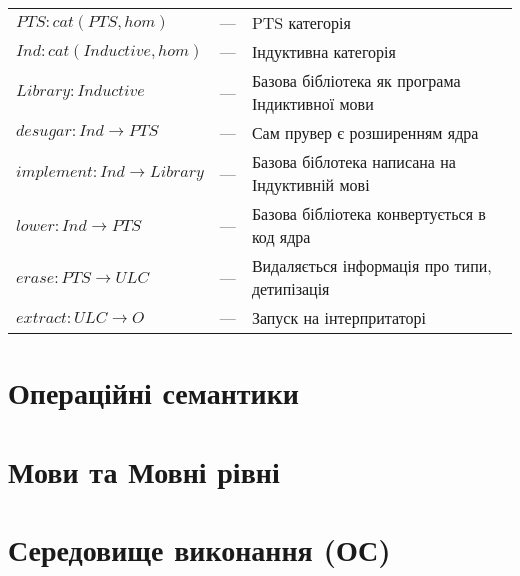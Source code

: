 \begin{center}
\end{center}

\begin{fullwidth}
\hspace{0cm}
\begin{tabular}{lll}
  $PTS: cat(PTS,hom)$ &---& PTS категорія \\
  $Ind: cat(Inductive,hom)$ &---& Індуктивна категорія \\
  $Library: Inductive$ &---& Базова бібліотека як програма Індиктивної мови\\
  $desugar: Ind \rightarrow PTS$ &---& Сам прувер є розширенням ядра \\
  $implement: Ind \rightarrow Library$ &---& Базова біблотека написана на Індуктивній мові \\
  $lower: Ind \rightarrow PTS$ &---& Базова бібліотека конвертується в код ядра \\
  $erase: PTS \rightarrow ULC$ &---& Видаляється інформація про типи, детипізація \\
  $extract: ULC \rightarrow O$ &---& Запуск на інтерпритаторі \\
\end{tabular}
\end{fullwidth}

\section{Операційні семантики}
\section{Мови та Мовні рівні}
\section{Середовище виконання (ОС)}
